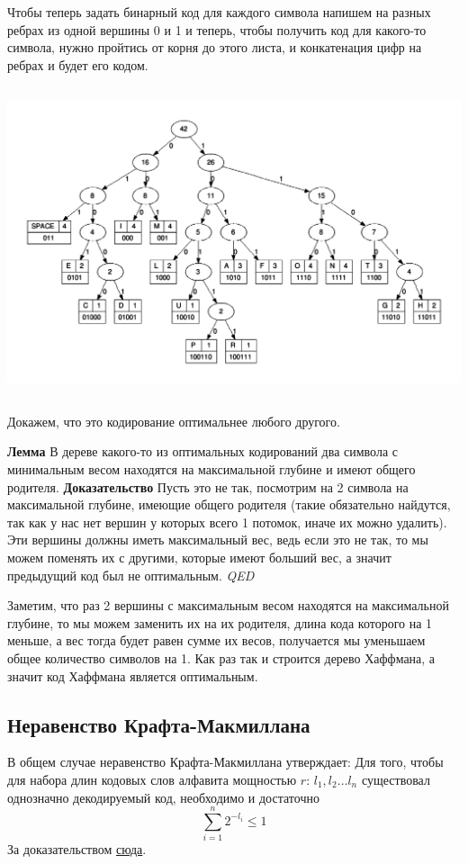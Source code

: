 \documentclass{article}
\begin{document}
Чтобы теперь задать бинарный код для каждого символа напишем на разных ребрах из одной вершины 0 и 1 и теперь, чтобы получить код для какого-то символа, нужно пройтись от корня до этого листа, и конкатенация цифр на ребрах и будет его кодом.
\begin{center}
  \includegraphics[height=9.1cm]{huffman.png}
\end{center}

Докажем, что это кодирование оптимальнее любого другого. 

\textbf{Лемма} В дереве какого-то из оптимальных кодирований два символа с минимальным весом находятся на максимальной глубине и имеют общего родителя.
\textbf{Доказательство} Пусть это не так, посмотрим на 2 символа на максимальной глубине, имеющие общего родителя (такие обязательно найдутся, так как у нас нет вершин у которых всего 1 потомок, иначе их можно удалить). Эти вершины должны иметь максимальный вес, ведь если это не так, то мы можем поменять их с другими, которые имеют больший вес, а значит предыдущий код был не оптимальным. \textit{QED}

Заметим, что раз 2 вершины с максимальным весом находятся на максимальной глубине, то мы можем заменить их на их родителя, длина кода которого на 1 меньше, а вес тогда будет равен сумме их весов, получается мы уменьшаем общее количество символов на 1. Как раз так и строится дерево Хаффмана, а значит код Хаффмана является оптимальным.
\subsection{Неравенство Крафта-Макмиллана}
В общем случае неравенство Крафта-Макмиллана утверждает: 
Для того, чтобы для набора длин кодовых слов алфавита мощностью $r$: $l_1, l_2 \dots l_n$ существовал однозначно декодируемый код, необходимо и достаточно $$\sum\limits_{i=1}^n2^{-l_i}\leq 1$$
За доказательством \href{https://neerc.ifmo.ru/wiki/index.php?title=%D0%9D%D0%B5%D1%80%D0%B0%D0%B2%D0%B5%D0%BD%D1%81%D1%82%D0%B2%D0%BE_%D0%9C%D0%B0%D0%BA%D0%BC%D0%B8%D0%BB%D0%BB%D0%B0%D0%BD%D0%B0}{сюда}.
\end{document}
